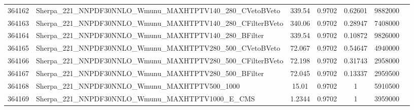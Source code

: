 \begin{landscape}
\begin{table}[!htb]
\begin{footnotesize}
\begin{center}
\begin{tabular}{|c|l|c|c|c|c|r|}
				364162 & Sherpa\_221\_NNPDF30NNLO\_Wmunu\_MAXHTPTV140\_280\_CVetoBVeto & 339.54 & 0.9702 & 0.62601 & 9882000 \\
				364163 & Sherpa\_221\_NNPDF30NNLO\_Wmunu\_MAXHTPTV140\_280\_CFilterBVeto & 340.06 & 0.9702 & 0.28947 & 7408000 \\
				364164 & Sherpa\_221\_NNPDF30NNLO\_Wmunu\_MAXHTPTV140\_280\_BFilter & 339.54 & 0.9702 & 0.10872 & 9826000 \\
				364165 & Sherpa\_221\_NNPDF30NNLO\_Wmunu\_MAXHTPTV280\_500\_CVetoBVeto & 72.067 & 0.9702 & 0.54647 & 4940000 \\
				364166 & Sherpa\_221\_NNPDF30NNLO\_Wmunu\_MAXHTPTV280\_500\_CFilterBVeto & 72.198 & 0.9702 & 0.31743 & 2958000 \\
				364167 & Sherpa\_221\_NNPDF30NNLO\_Wmunu\_MAXHTPTV280\_500\_BFilter & 72.045 & 0.9702 & 0.13337 & 2959500 \\
				364168 & Sherpa\_221\_NNPDF30NNLO\_Wmunu\_MAXHTPTV500\_1000 & 15.01 & 0.9702 & 1 & 5910500 \\
				364169 & Sherpa\_221\_NNPDF30NNLO\_Wmunu\_MAXHTPTV1000\_E\_CMS & 1.2344 & 0.9702 & 1 & 3959000 \\
				\hline
			\end{tabular}
		\end{center}
	\end{footnotesize}
\end{table}


\end{landscape}
